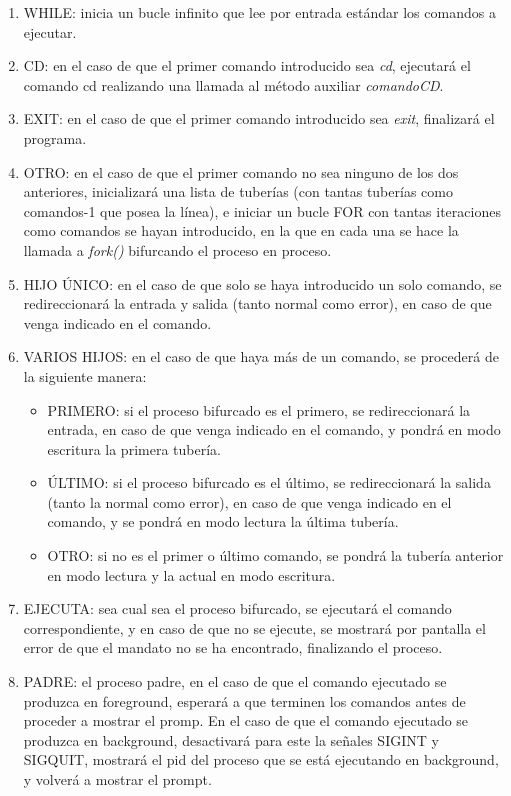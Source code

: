 \begin{enumerate}
 \item WHILE: inicia un bucle infinito que lee por entrada estándar los comandos a ejecutar.
 \item CD: en el caso de que el primer comando introducido sea \textit{cd}, ejecutará el comando cd realizando una llamada al método auxiliar \textit{comandoCD}.
 \item EXIT: en el caso de que el primer comando introducido sea \textit{exit}, finalizará el programa.
 \item OTRO: en el caso de que el primer comando no sea ninguno de los dos anteriores, inicializará una lista de tuberías (con tantas tuberías como comandos-1 que posea la línea), e iniciar un bucle FOR con tantas iteraciones como comandos se hayan introducido, en la que en cada una se hace la llamada a \textit{fork()} bifurcando el proceso en proceso.
 \item HIJO ÚNICO: en el caso de que solo se haya introducido un solo comando, se redireccionará la entrada y salida (tanto normal como error), en caso de que venga indicado en el comando.
 \item VARIOS HIJOS: en el caso de que haya más de un comando, se procederá de la siguiente manera:
 \begin{itemize}
  \item PRIMERO: si el proceso bifurcado es el primero, se redireccionará la entrada, en caso de que venga indicado en el comando, y pondrá en modo escritura la primera tubería.
  \item ÚLTIMO: si el proceso bifurcado es el último, se redireccionará la salida (tanto la normal como error), en caso de que venga indicado en el comando, y se pondrá en modo lectura la última tubería.
  \item OTRO: si no es el primer o último comando, se pondrá la tubería anterior en modo lectura y la actual en modo escritura.
 \end{itemize}
 \item EJECUTA: sea cual sea el proceso bifurcado, se ejecutará el comando correspondiente, y en caso de que no se ejecute, se mostrará por pantalla el error de que el mandato no se ha encontrado, finalizando el proceso.
 \item PADRE: el proceso padre, en el caso de que el comando ejecutado se produzca en foreground, esperará a que terminen los comandos antes de proceder a mostrar el promp. En el caso de que el comando ejecutado se produzca en background, desactivará para este la señales SIGINT y SIGQUIT, mostrará el pid del proceso que se está ejecutando en background, y volverá a mostrar el prompt.
\end{enumerate}

